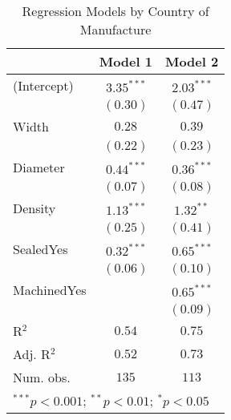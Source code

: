 
\begin{table}
\begin{center}
\begin{tabular}{l c c}
\hline
 & Model 1 & Model 2 \\
\hline
(Intercept) & $3.35^{***}$ & $2.03^{***}$ \\
            & $(0.30)$     & $(0.47)$     \\
Width       & $0.28$       & $0.39$       \\
            & $(0.22)$     & $(0.23)$     \\
Diameter    & $0.44^{***}$ & $0.36^{***}$ \\
            & $(0.07)$     & $(0.08)$     \\
Density     & $1.13^{***}$ & $1.32^{**}$  \\
            & $(0.25)$     & $(0.41)$     \\
SealedYes   & $0.32^{***}$ & $0.65^{***}$ \\
            & $(0.06)$     & $(0.10)$     \\
MachinedYes &              & $0.65^{***}$ \\
            &              & $(0.09)$     \\
\hline
R$^2$       & $0.54$       & $0.75$       \\
Adj. R$^2$  & $0.52$       & $0.73$       \\
Num. obs.   & $135$        & $113$        \\
\hline
\multicolumn{3}{l}{\scriptsize{$^{***}p<0.001$; $^{**}p<0.01$; $^{*}p<0.05$}}
\end{tabular}
\caption{Regression Models by Country of Manufacture}
\label{tab:reg_by_country}
\end{center}
\end{table}
